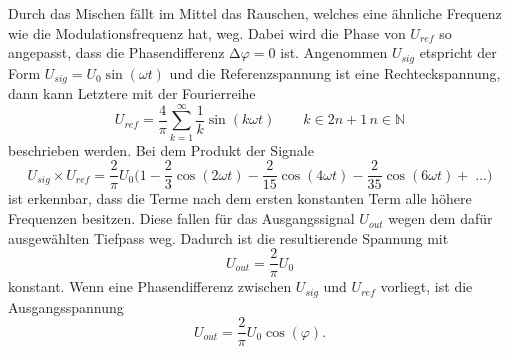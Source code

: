 \noindent Durch das Mischen fällt im Mittel das Rauschen, welches eine ähnliche Frequenz wie die Modulationsfrequenz hat, weg.
Dabei wird die Phase von $U_{ref}$ so angepasst, dass die Phasendifferenz $\increment \varphi=0$ ist.
Angenommen $U_{sig}$ etspricht der Form $U_{sig}=U_0 \sin(\omega t)$ und die Referenzspannung ist eine Rechteckspannung, dann kann Letztere mit der Fourierreihe 
\begin{equation}
    U_{ref}=\frac{4}{\pi} \sum_{k=1}^\infty \frac{1}{k}\sin(k\omega t) \qquad k \in 2n+1 \, n \in \mathbb{N}
    \label{eqn:Fourier}
\end{equation}
beschrieben werden.
Bei dem Produkt der Signale 
\begin{equation}
    U_{sig} \times U_{ref}=\frac{2}{\pi}U_0 \biggl(1-\frac{2}{3}\cos(2\omega t)-\frac{2}{15}\cos(4\omega t)- \frac{2}{35}\cos(6 \omega t)+ \; ...\biggr)
    \label{eqn:Produkt}
\end{equation}
ist erkennbar, dass die Terme nach dem ersten konstanten Term alle höhere Frequenzen besitzen.
Diese fallen für das Ausgangssignal $U_{out}$ wegen dem dafür ausgewählten Tiefpass weg.
Dadurch ist die resultierende Spannung mit
\begin{equation}
    U_{out}=\frac{2}{\pi}U_0
    \label{eqn:konst}
\end{equation}
konstant.
Wenn eine Phasendifferenz zwischen $U_{sig}$ und $U_{ref}$ vorliegt, ist die Ausgangsspannung 
\begin{equation}
    U_{out}=\frac{2}{\pi}U_0 \cos(\varphi).
    \label{eqn:cos}
\end{equation}
